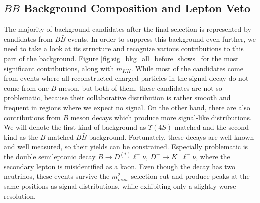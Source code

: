 \subsection{$B \bar B$ Background Composition and Lepton Veto}

The majority of background candidates after the final selection is represented by candidates from $B \bar B$ events. In order to suppress this background even further, we need to take a look at its structure and recognize various contributions to this part of the background. Figure \ref{fig:sig_bkg_all_before} shows \vars~for the most significant contributions, along with $m_{KK}$. While most of the candidates come from events where all reconstructed charged particles in the signal decay do not come from one $B$ meson, but both of them, these candidates are not so problematic, because their collaborative distribution is rather smooth and frequent in regions where we expect no signal. On the other hand, there are also contributions from $B$ meson decays which produce more signal-like distributions. We will denote the first kind of background as $\Upsilon(4S)$-matched and the second kind as the $B$-matched $B \bar B$ background. Fortunately, these decays are well known and well measured, so their yields can be constrained. Especially problematic is the double semileptonic decay $B \to \bar D {}^{(*)} \ell^+ \nu,~D^+ \to \bar K^- \ell^+ \nu$, where the secondary lepton is misidentified as a kaon. Even though the decay has two neutrinos, these events survive the $m_{miss}^2$ selection cut and produce peaks at the same positions as signal distributions, while exhibiting only a slightly worse resolution. 

